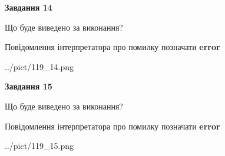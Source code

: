 \documentclass[11pt, ukrainian]{article}
\begin{document}
{\begin {large}
{\begin {center}\textbf{Завдання 14}\end {center}}\par
Що буде виведено за виконання? \par
Повідомлення інтерпретатора про помилку позначати \textbf{error}

\begin{center}
	{../pict/119_14.png}
\end{center}
\newpage

{\begin {center}\textbf{Завдання 15}\end {center}}\par
Що буде виведено за виконання? \par
Повідомлення інтерпретатора про помилку позначати \textbf{error}

\begin{center}
	{../pict/119_15.png}
\end{center}
\newpage

\end {large}}
\end{document}
